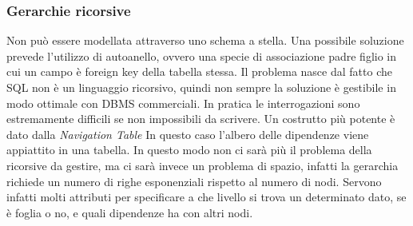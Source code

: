 \subsubsection{Gerarchie ricorsive}
Non può essere modellata attraverso uno schema a stella.
Una possibile soluzione prevede l'utilizzo di autoanello, ovvero una specie di associazione padre figlio in cui un campo è foreign key della tabella stessa.\newline
Il problema nasce dal fatto che SQL non è un linguaggio ricorsivo, quindi non sempre la soluzione è gestibile in modo ottimale con DBMS commerciali. In pratica le interrogazioni sono estremamente difficili se non impossibili da scrivere.\newline
Un costrutto più potente è dato dalla \textit{Navigation Table}
In questo caso l'albero delle dipendenze viene appiattito in una tabella. In questo modo non ci sarà più il problema della ricorsive da gestire, ma ci sarà invece un problema di spazio, infatti la gerarchia richiede un numero di righe esponenziali rispetto al numero di nodi.\newline
Servono infatti molti attributi per specificare a che livello si trova un determinato dato, se è foglia o no, e quali dipendenze ha con altri nodi.

